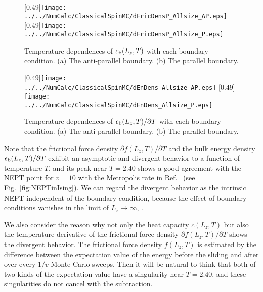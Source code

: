 \begin{figure}[htbp]
	\centering
	\subcaptionbox{\label{fig:dFricDens_Allsize_AP}}[0.49\linewidth]{\texttt{[image: ../../NumCalc/ClassicalSpinMC/dFricDensP\_Allsize\_AP.eps]}}
	\subcaptionbox{\label{fig:dFricDens_Allsize_P}}[0.49\linewidth]{\texttt{[image: ../../NumCalc/ClassicalSpinMC/dFricDensP\_Allsize\_P.eps]}}
	
	\caption{Temperature dependences of $c_{\rm b}(L_{z}, T)$ with each boundary condition. (a) The anti-parallel boundary. (b) The parallel boundary.}
	\label{fig:dFricDens_Allsize}
\end{figure}

\begin{figure}[htbp]
	\centering
	\subcaptionbox{\label{fig:dEnDens_Allsize_AP}}[0.49\linewidth]{\texttt{[image: ../../NumCalc/ClassicalSpinMC/dEnDens\_Allsize\_AP.eps]}}
	\subcaptionbox{\label{fig:dEnDens_Allsize_P}}[0.49\linewidth]{\texttt{[image: ../../NumCalc/ClassicalSpinMC/dEnDens\_Allsize\_P.eps]}}
	
	\caption{Temperature dependences of $\epsilon_{\rm b}(L_{z}, T)/\partial T$ with each boundary condition. (a) The anti-parallel boundary. (b) The parallel boundary.}
	\label{fig:dEnDens_Allsize}
\end{figure}

Note that the frictional force density $\partial f(L_{z}, T)/\partial T$ and the bulk energy density $\epsilon_{\rm b}(L_{z}, T)/\partial T$ exhibit an asymptotic and divergent behavior to a function of temperature $T$, and its peak near $T=2.40$ shows a good agreement with the NEPT point for $v=10$ with the Metropolis rate in Ref.~\cite{Hucht2009b} (see Fig.~\ref{fig:NEPTinIsing}). We can regard the divergent behavior as the intrinsic NEPT independent of the boundary condition, because the effect of boundary conditions vanishes in the limit of $L_{z}\to\infty$, .

We also consider the reason why not only the heat capacity $c(L_{z}, T)$ but also the temperature derivative of the frictional force density $\partial f(L_{z}, T)/\partial T$ shows the divergent behavior. The frictional force density $f(L_{z}, T)$ is estimated by the difference between the expectation value of the energy before the sliding and after over every $1/v$ Monte Carlo sweeps. Then it will be natural to think that both of two kinds of the expectation value have a singularity near $T=2.40$, and these singularities do not cancel with the subtraction.

